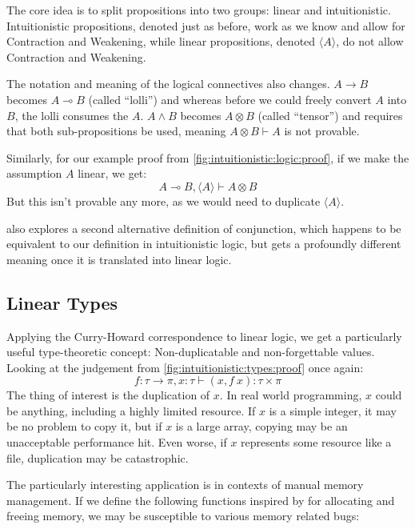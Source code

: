 \documentclass[sigplan,11pt,screen,nonacm]{acmart}
\begin{document}
The core idea is to split propositions into two groups: linear and intuitionistic. Intuitionistic propositions, denoted just as before, work as we know and allow for Contraction and Weakening, while linear propositions, denoted \(\langle A\rangle\), do not allow Contraction and Weakening.

The notation and meaning of the logical connectives also changes. \(A \rightarrow B\) becomes \(A \multimap B\) (called \enquote{lolli}) and whereas before we could freely convert \(A\) into \(B\), the lolli consumes the \(A\). \(A \land B\) becomes \(A \otimes B\) (called \enquote{tensor}) and requires that both sub-propositions be used, meaning \(A \otimes B \vdash A\) is not provable.

Similarly, for our example proof from \cref{fig:intuitionistic:logic:proof}, if we make the assumption \(A\) linear, we get: \[A \multimap B, \langle A\rangle \vdash A \otimes B\] But this isn't provable any more, as we would need to duplicate \(\langle A\rangle\).

\citet{wadler-linear-taste} also explores a second alternative definition of conjunction, which happens to be equivalent to our definition in intuitionistic logic, but gets a profoundly different meaning once it is translated into linear logic.

\subsection{Linear Types} \label{sec:linear:types}

Applying the Curry-Howard correspondence to linear logic, we get a particularly useful type-theoretic concept: Non-duplicatable and non-forgettable values. Looking at the judgement from \cref{fig:intuitionistic:types:proof} once again: \[f : \tau \rightarrow \pi, x : \tau \vdash (x, f\ x) : \tau \times \pi\] The thing of interest is the duplication of \(x\). In real world programming, \(x\) could be anything, including a highly limited resource. If \(x\) is a simple integer, it may be no problem to copy it, but if \(x\) is a large array, copying may be an unacceptable performance hit. Even worse, if \(x\) represents some resource like a file, duplication may be catastrophic.

The particularly interesting application is in contexts of manual memory management. If we define the following functions inspired by \citet{from-linearity-to-borrowing} for allocating and freeing memory, we may be susceptible to various memory related bugs:
\end{document}
